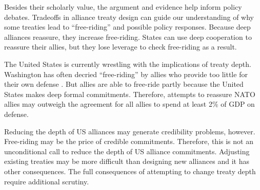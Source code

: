 \documentclass[12pt]{article}
\begin{document}
Besides their scholarly value, the argument and evidence help inform policy debates. 
Tradeoffs in alliance treaty design can guide our understanding of why some treaties lead to ``free-riding'' and possible policy responses. 
Because deep alliances reassure, they increase free-riding. 
States can use deep cooperation to reassure their allies, but they lose leverage to check free-riding as a result. 


The United States is currently wrestling with the implications of treaty depth. 
Washington has often decried ``free-riding'' by allies who provide too little for their own defense \citep{Lanoszka2015}. 
But allies are able to free-ride partly because the United States makes deep formal commitments. 
Therefore, attempts to reassure NATO allies may outweigh the agreement for all allies to spend at least 2\% of GDP on defense.


Reducing the depth of US alliances may generate credibility problems, however. 
Free-riding may be the price of credible commitments.  
Therefore, this is not an unconditional call to reduce the depth of US alliance commitments. 
Adjusting existing treaties may be more difficult than designing new alliances and it has other consequences. 
The full consequences of attempting to change treaty depth require additional scrutiny. 

 



\singlespace
 
 
\end{document}
